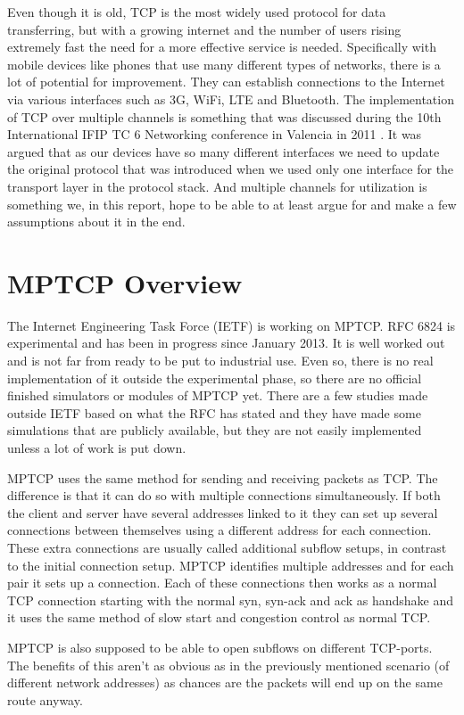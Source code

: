 \documentclass[11pt,twocolumn]{article}
\begin{document}
Even though it is old, TCP is the most widely used protocol for data transferring, but with a growing internet and the number of users rising extremely fast the need for a more effective service is needed. Specifically with mobile devices like phones that use many different types of networks, there is a lot of potential for improvement. They can establish connections to the Internet via various interfaces such as 3G, WiFi, LTE and Bluetooth. The implementation of TCP over multiple channels is something that was discussed during the 10th International IFIP TC 6 Networking conference in Valencia in 2011 \cite{RFC6824}. It was argued that as our devices have so many different interfaces we need to update the original protocol that was introduced when we used only one interface for the transport layer in the protocol stack. And multiple channels for utilization is something we, in this report, hope to be able to at least argue for and make a few assumptions about it in the end.

\section{MPTCP Overview}
The Internet Engineering Task Force (IETF) is working on MPTCP. RFC 6824 is experimental and has been in progress since January 2013. It is well worked out and is not far from ready to be put to industrial use. Even so, there is no real implementation of it outside the experimental phase, so there are no official finished simulators or modules of MPTCP yet. There are a few studies made outside IETF based on what the RFC has stated and they have made some simulations that are publicly available, but they are not easily implemented unless a lot of work is put down.

MPTCP uses the same method for sending and receiving packets as TCP. The difference is that it can do so with multiple connections simultaneously. If both the client and server have several addresses linked to it they can set up several connections between themselves using a different address for each connection. These extra connections are usually called additional subflow setups, in contrast to the initial connection setup. MPTCP identifies multiple addresses and for each pair it sets up a connection. Each of these connections then works as a normal TCP connection starting with the normal syn, syn-ack and ack as handshake and it uses the same method of slow start and congestion control as normal TCP.

MPTCP is also supposed to be able to open subflows on different TCP-ports. The benefits of this  aren't as obvious as in the previously mentioned scenario (of different network addresses) as chances are the packets will end up on the same route anyway.
\end{document}
